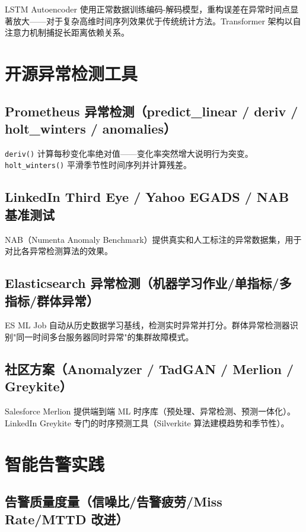 \documentclass[12pt,UTF8]{ctexbook}
\begin{document}
LSTM Autoencoder 使用正常数据训练编码-解码模型，重构误差在异常时间点显著放大——对于复杂高维时间序列效果优于传统统计方法。Transformer 架构以自注意力机制捕捉长距离依赖关系。

  \section{开源异常检测工具}
    \subsection{Prometheus 异常检测（predict\_linear / deriv / holt\_winters / anomalies）}

\texttt{deriv()} 计算每秒变化率绝对值——变化率突然增大说明行为突变。\texttt{holt\_winters()} 平滑季节性时间序列并计算残差。

    \subsection{LinkedIn Third Eye / Yahoo EGADS / NAB 基准测试}

NAB（Numenta Anomaly Benchmark）提供真实和人工标注的异常数据集，用于对比各异常检测算法的效果。

    \subsection{Elasticsearch 异常检测（机器学习作业/单指标/多指标/群体异常）}

ES ML Job 自动从历史数据学习基线，检测实时异常并打分。群体异常检测器识别"同一时间多台服务器同时异常"的集群故障模式。

    \subsection{社区方案（Anomalyzer / TadGAN / Merlion / Greykite）}

Salesforce Merlion 提供端到端 ML 时序库（预处理、异常检测、预测一体化）。LinkedIn Greykite 专门的时序预测工具（Silverkite 算法建模趋势和季节性）。

  \section{智能告警实践}
    \subsection{告警质量度量（信噪比/告警疲劳/Miss Rate/MTTD 改进）}
\end{document}
